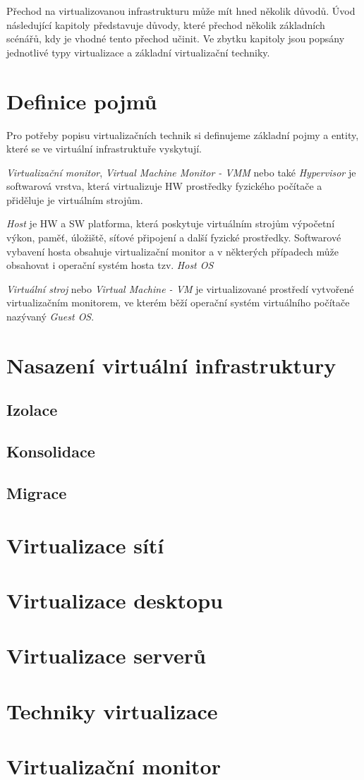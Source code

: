 Přechod na virtualizovanou infrastrukturu může mít hned několik důvodů. Úvod následující kapitoly představuje důvody, které přechod několik základních scénářů, kdy je vhodné tento přechod učinit.
Ve zbytku kapitoly jsou popsány jednotlivé typy virtualizace a základní virtualizační techniky.
\section{Definice pojmů}
Pro potřeby popisu virtualizačních technik si definujeme základní pojmy a entity, které se ve virtuální infrastruktuře vyskytují.

\textit{Virtualizační monitor}, \textit{Virtual Machine Monitor - VMM} nebo také \textit{Hypervisor} je softwarová vrstva, která virtualizuje HW prostředky fyzického počítače a přiděluje je
virtuálním strojům.

\textit{Host} je HW a SW platforma, která poskytuje virtuálním strojům výpočetní výkon, paměť, úložiště, síťové připojení a další fyzické prostředky. Softwarové vybavení hosta obsahuje virtualizační
monitor a v některých případech může obsahovat i operační systém hosta tzv. \textit{Host OS}

\textit{Virtuální stroj} nebo \textit{Virtual Machine - VM} je virtualizované prostředí vytvořené virtualizačním monitorem, ve kterém běží operační systém virtuálního počítače nazývaný \textit{Guest OS}.

\section{Nasazení virtuální infrastruktury}

\subsection{Izolace}
\subsection{Konsolidace}
\subsection{Migrace}

\section{Virtualizace sítí}
\section{Virtualizace desktopu}
\section{Virtualizace serverů}
\section{Techniky virtualizace}
\section{Virtualizační monitor}
